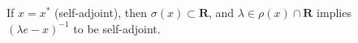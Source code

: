 If $x = x^*$ (self-adjoint), then $\sigma(x) \subset \mathbf{R}$, and $\lambda \in \rho(x) \cap \mathbf{R}$ implies $(\lambda e - x)^{-1}$ to be self-adjoint.
